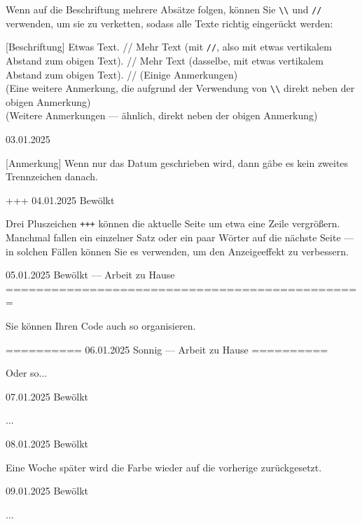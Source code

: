 \documentclass[11pt, paperstyle=light yellow, color entry, day-month-year,
  title in boldface, title in sffamily, use style = classical]{jwjournal}
\begin{document}
  Wenn auf die Beschriftung mehrere Absätze folgen, können Sie \texttt{\textbackslash\textbackslash} und \texttt{\slash\slash} verwenden, um sie zu verketten, sodass alle Texte richtig eingerückt werden:

  [Beschriftung] Etwas Text.
    //
    Mehr Text (mit \texttt{\slash\slash}, also mit etwas vertikalem Abstand zum obigen Text).
    //
    Mehr Text (dasselbe, mit etwas vertikalem Abstand zum obigen Text).
    //
    (Einige Anmerkungen)
    \\
    (Eine weitere Anmerkung, die aufgrund der Verwendung von \texttt{\textbackslash\textbackslash} direkt neben der obigen Anmerkung)
    \\
    (Weitere Anmerkungen --- ähnlich, direkt neben der obigen Anmerkung)



03.01.2025

  [Anmerkung] Wenn nur das Datum geschrieben wird, dann gäbe es kein zweites Trennzeichen danach.


+++
04.01.2025  Bewölkt

  Drei Pluszeichen \texttt{+++} können die aktuelle Seite um etwa eine Zeile vergrößern. Manchmal fallen ein einzelner Satz oder ein paar Wörter auf die nächste Seite --- in solchen Fällen können Sie es verwenden, um den Anzeigeeffekt zu verbessern.



05.01.2025    Bewölkt       --- Arbeit zu Hause
===============================================

Sie können Ihren Code auch so organisieren.


==========
06.01.2025    Sonnig        --- Arbeit zu Hause
==========

Oder so...



07.01.2025  Bewölkt

  ...



08.01.2025  Bewölkt

  Eine Woche später wird die Farbe wieder auf die vorherige zurückgesetzt.



09.01.2025  Bewölkt

  ...
\end{document}
